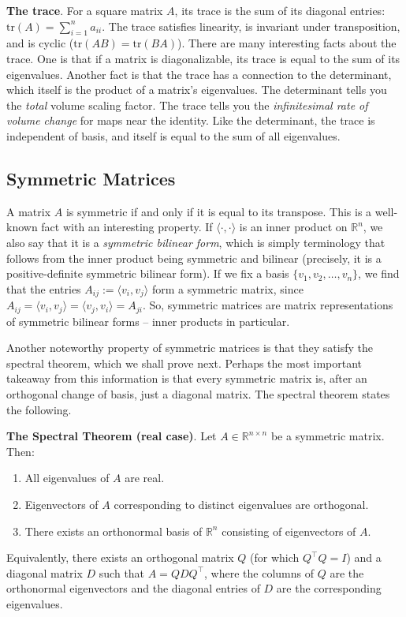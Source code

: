 \documentclass{article}
\begin{document}
\noindent \textbf{The trace}. For a square matrix $A$, its trace is the sum of its diagonal entries: $\text{tr}(A)=\sum_{i=1}^na_{ii}$. The trace satisfies linearity, is invariant under transposition, and is cyclic ($\text{tr}(AB)=\text{tr}(BA)$). There are many interesting facts about the trace. One is that if a matrix is diagonalizable, its trace is equal to the sum of its eigenvalues. Another fact is that the trace has a connection to the determinant, which itself is the product of a matrix's eigenvalues. The determinant tells you the \textit{total} volume scaling factor. The trace tells you the \textit{infinitesimal rate of volume change} for maps near the identity. Like the determinant, the trace is independent of basis, and itself is equal to the sum of all eigenvalues.
 
\subsection{Symmetric Matrices}
A matrix $A$ is symmetric if and only if it is equal to its transpose. This is a well-known fact with an interesting property. If $\langle \cdot, \cdot \rangle$ is an inner product on $\mathbb{R}^n$, we also say that it is a \textit{symmetric bilinear form}, which is simply terminology that follows from the inner product being symmetric and bilinear (precisely, it is a positive-definite symmetric bilinear form). If we fix a basis $\{v_1, v_2, \dots, v_n\}$, we find that the entries $A_{ij}:=\langle v_i, v_j \rangle$ form a symmetric matrix, since $A_{ij}=\langle v_i, v_j \rangle=\langle v_j, v_i \rangle = A_{ji}$. So, symmetric matrices are matrix representations of symmetric bilinear forms -- inner products in particular.
 
Another noteworthy property of symmetric matrices is that they satisfy the spectral theorem, which we shall prove next. Perhaps the most important takeaway from this information is that every symmetric matrix is, after an orthogonal change of basis, just a diagonal matrix. The spectral theorem states the following.
 
\noindent \textbf{The Spectral Theorem (real case)}. Let $A \in \mathbb{R}^{n\times n}$ be a symmetric matrix. Then:
\begin{enumerate}
    \item All eigenvalues of $A$ are real.
    \item Eigenvectors of $A$ corresponding to distinct eigenvalues are orthogonal.
    \item There exists an orthonormal basis of $\mathbb{R}^n$ consisting of eigenvectors of $A$.
\end{enumerate}
Equivalently, there exists an orthogonal matrix $Q$ (for which $Q^\top Q = I$) and a diagonal matrix $D$ such that $A = QDQ^\top$, where the columns of $Q$ are the orthonormal eigenvectors and the diagonal entries of $D$ are the corresponding eigenvalues.
\end{document}
